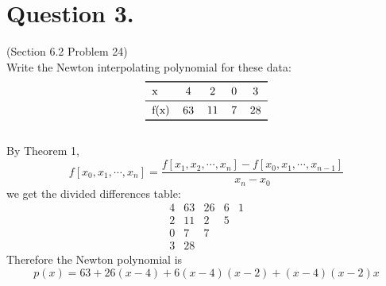\documentclass[10pt]{report}
\begin{document}
\section*{Question 3.}
(Section 6.2 Problem 24)\\
Write the Newton interpolating polynomial for these data:
\[
	\begin{tabular}{lcccc} 
		\toprule
		x & 4 & 2 & 0 & 3 \\ \midrule
		f(x) & 63 & 11 & 7 & 28 \\
		\bottomrule
	\end{tabular}
\]
\\
By Theorem 1,
\[	
f[x_0, x_1, \cdots, x_n] = \frac{f[x_1, x_2, \cdots, x_n] - f[x_0, x_1, \cdots, x_{n-1}]}{x_n - x_0}
\]
we get the divided differences table:
\[
\begin{array}{cc|ccc}
4 & 63 & 26 & 6 & 1 \\
2 & 11  & 2   & 5 \\
0 & 7   & 7 \\
3 & 28
\end{array}
\]
Therefore the Newton polynomial is
\[
p(x) = 63 + 26(x-4) + 6(x-4)(x-2) + (x-4)(x-2)x
\]
\end{document}
